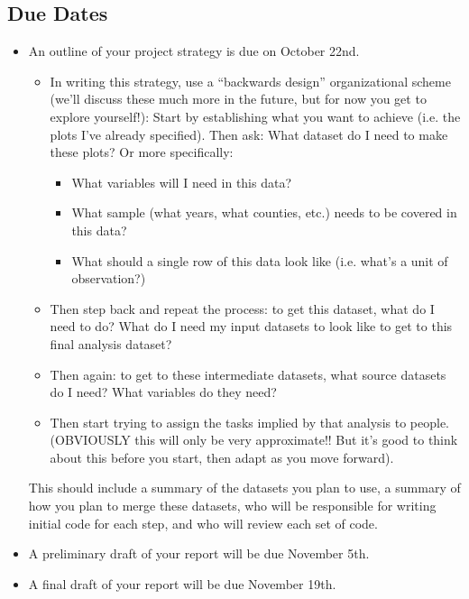 \documentclass[12pt]{article}
\begin{document}
\subsection*{Due Dates}
\begin{itemize}
  \item An outline of your project strategy is due on October 22nd.
  \begin{itemize}
    \item In writing this strategy, use a ``backwards design'' organizational scheme (we'll discuss these much more in the future, but for now you get to explore yourself!): Start by establishing what you want to achieve (i.e. the plots I've already specified). Then ask: What dataset do I need to make these plots? Or more specifically:
    \begin{itemize}
      \item What variables will I need in this data?
      \item What sample (what years, what counties, etc.) needs to be covered in this data?
      \item What should a single row of this data look like (i.e. what's a unit of observation?)
    \end{itemize}
    \item Then step back and repeat the process: to get this dataset, what do I need to do? What do I need my input datasets to look like to get to this final analysis dataset?
    \item Then again: to get to these intermediate datasets, what source datasets do I need? What variables do they need?
    \item Then start trying to assign the tasks implied by that analysis to people. (OBVIOUSLY this will only be very approximate!! But it's good to think about this before you start, then adapt as you move forward).
  \end{itemize}
  This should include a summary of the datasets you plan to use, a summary of how you plan to merge these datasets, who will be responsible for writing initial code for each step, and who will review each set of code.
  \item A preliminary draft of your report will be due November 5th.
  \item A final draft of your report will be due November 19th.
\end{itemize}
\end{document}
